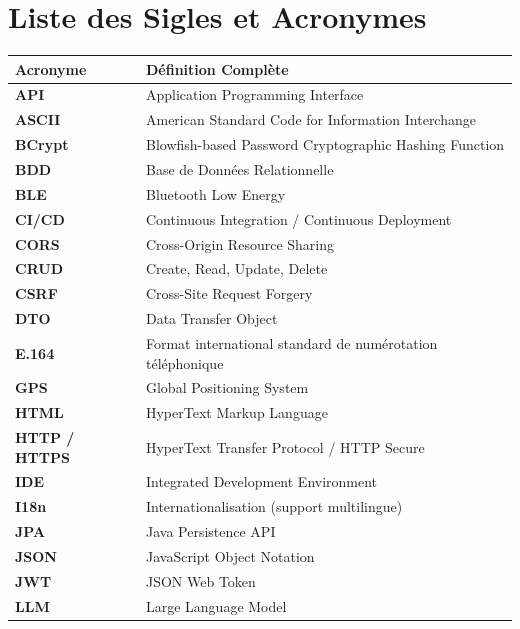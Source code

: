 \documentclass[12pt,a4paper,twoside,openright]{report}
\begin{document}
  \chapter*{Liste des Sigles et Acronymes}

  \begin{longtable}{p{} p{}}
  \toprule
  \textbf{Acronyme} & \textbf{D\'efinition Compl\`ete} \\
  \midrule
  \endhead
  \textbf{API} & Application Programming Interface \\
  \textbf{ASCII} & American Standard Code for Information Interchange \\
  \textbf{BCrypt} & Blowfish-based Password Cryptographic Hashing Function \\
  \textbf{BDD} & Base de Donn\'ees Relationnelle \\
  \textbf{BLE} & Bluetooth Low Energy \\
  \textbf{CI/CD} & Continuous Integration / Continuous Deployment \\
  \textbf{CORS} & Cross-Origin Resource Sharing \\
  \textbf{CRUD} & Create, Read, Update, Delete \\
  \textbf{CSRF} & Cross-Site Request Forgery \\
  \textbf{DTO} & Data Transfer Object \\
  \textbf{E.164} & Format international standard de num\'erotation t\'el\'ephonique \\
  \textbf{GPS} & Global Positioning System \\
  \textbf{HTML} & HyperText Markup Language \\
  \textbf{HTTP / HTTPS} & HyperText Transfer Protocol / HTTP Secure \\
  \textbf{IDE} & Integrated Development Environment \\
  \textbf{I18n} & Internationalisation (support multilingue) \\
  \textbf{JPA} & Java Persistence API \\
  \textbf{JSON} & JavaScript Object Notation \\
  \textbf{JWT} & JSON Web Token \\
  \textbf{LLM} & Large Language Model \\

\end{longtable}
\end{document}
